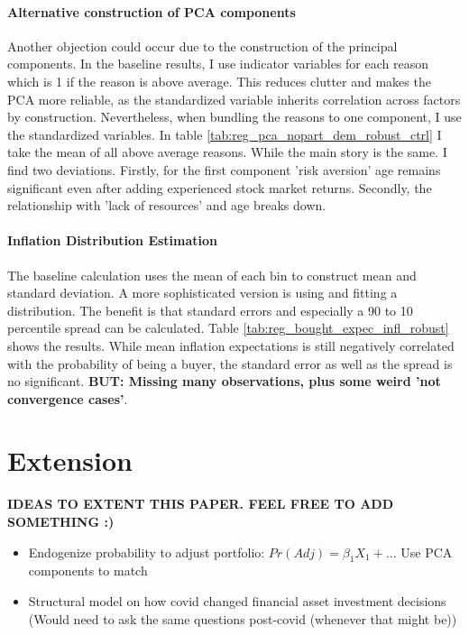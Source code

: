 \documentclass[ProjectABM]{subfiles}
\begin{document}
\paragraph{Alternative construction of PCA components}
Another objection could occur due to the construction of the principal components. In the baseline results, I use indicator variables for each reason which is 1 if the reason is above average. This reduces clutter and makes the PCA more reliable, as the standardized variable inherits correlation across factors by construction. Nevertheless, when bundling the reasons to one component, I use the standardized variables. In table \ref{tab:reg_pca_nopart_dem_robust_ctrl} I take the mean of all above average reasons. While the main story is the same. I find two deviations. Firstly, for the first component 'risk aversion' age remains significant even after adding experienced stock market returns. Secondly, the relationship with 'lack of resources' and age breaks down.

\paragraph{Inflation Distribution Estimation}
The baseline calculation uses the mean of each bin to construct mean and standard deviation. A more sophisticated version is using \cite{engelberg_manski_2009distribution} and fitting a distribution. The benefit is that standard errors and especially a 90 to 10 percentile spread can be calculated. Table \ref{tab:reg_bought_expec_infl_robust} shows the results. While mean inflation expectations is still negatively correlated with the probability of being a buyer, the standard error as well as the spread is no significant. \textbf{BUT: Missing many observations, plus some weird 'not convergence cases'}.

\section{Extension}
\textbf{IDEAS TO EXTENT THIS PAPER. FEEL FREE TO ADD SOMETHING :)}
\begin{itemize}
	\item Endogenize probability to adjust portfolio: $Pr(Adj) = \beta_1 X_1 + ...$ Use PCA components to match
	\item Structural model on how covid changed financial asset investment decisions (Would need to ask the same questions post-covid (whenever that might be))
\end{itemize}
\end{document}
